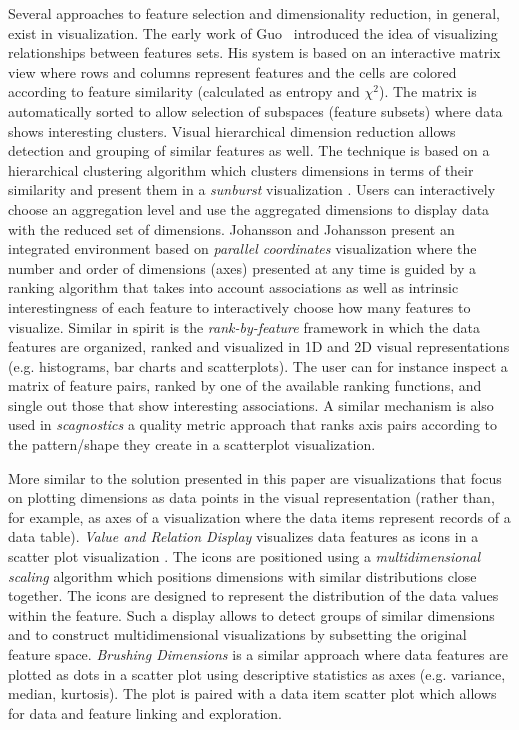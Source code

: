Several approaches to feature selection and dimensionality reduction, in general, exist in visualization.
The early work of Guo~\cite{Guo2003} introduced the idea of
visualizing relationships between features sets.
His system is based on an interactive matrix view where rows and
columns represent features and the cells are colored according to
feature similarity (calculated as entropy and ${\chi}^2$).
The matrix is automatically sorted to allow selection of subspaces
(feature subsets) where data shows interesting clusters.
Visual hierarchical dimension reduction \cite{wang2003interactive}
allows detection and grouping of similar features as well.
The technique is based on a hierarchical clustering algorithm
which clusters dimensions in terms of their similarity and present
them in a \textit{sunburst} visualization \cite{yang2003interactive}.
Users can interactively choose an aggregation level and use the aggregated
dimensions to display data with the reduced set of dimensions.
Johansson and Johansson \cite{Johansson2009} present an integrated environment based on
\textit{parallel coordinates} visualization where the number and order of
dimensions (axes) presented at any time is guided by a ranking algorithm
that takes into account associations as well as intrinsic interestingness of
each feature to interactively choose how many features to visualize.
Similar in spirit is the \textit{rank-by-feature} framework \cite{seo2005rank} in which
the data features are organized, ranked and visualized in
1D and 2D visual representations
(e.g. histograms, bar charts and scatterplots).
The user can for instance inspect a matrix of feature pairs,
ranked by one of the available ranking functions, and single
out those that show interesting associations.
A similar mechanism is also used in \textit{scagnostics} \cite{wilkinson2005graph} a
quality metric approach \cite{bertini2011quality} that ranks axis pairs according to the pattern/shape they create in a scatterplot visualization.

More similar to the solution presented in this paper are visualizations that
focus on plotting dimensions as data points in the visual representation
(rather than, for example, as axes of a visualization where the data
items represent records of a data table).
\textit{Value and Relation Display} visualizes data features as icons
in a scatter plot visualization \cite{YangPHMWR04}.
The icons are positioned using a \textit{multidimensional scaling}
algorithm which positions dimensions with
similar distributions close together.
The icons are designed to represent the distribution of the
data values within the feature.
Such a display allows to detect groups of similar dimensions
and to construct multidimensional visualizations by subsetting
the original feature space.
\textit{Brushing Dimensions} \cite{Turkay2011} is a similar approach
where data features are plotted as dots in a scatter plot using
descriptive statistics as axes (e.g. variance, median, kurtosis).
The plot is paired with a data item scatter plot which allows for data
and feature linking and exploration.

